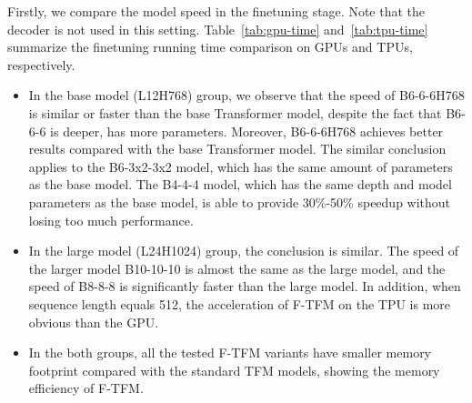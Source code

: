 \documentclass{article}
\theoremstyle{custom}
\begin{document}
Firstly, we compare the model speed in the finetuning stage. 
Note that the decoder is not used in this setting.
Table~\ref{tab:gpu-time} and~\ref{tab:tpu-time} summarize the finetuning running time comparison on GPUs and TPUs, respectively. 
\begin{itemize}[leftmargin=*,itemsep=0em]
\item In the base model (L12H768) group, we observe that the speed of B6-6-6H768 is similar or faster than the base Transformer model, despite the fact that B6-6-6 is deeper, has more parameters. 
Moreover, B6-6-6H768 achieves better results compared with the base Transformer model.
The similar conclusion applies to the B6-3x2-3x2 model, which has the same amount of parameters as the base model.
The B4-4-4 model, which has the same depth and model parameters as the base model, is able to provide 30\%-50\% speedup without losing too much performance. 
\item In the large model (L24H1024) group, the conclusion is similar. The speed of the larger model B10-10-10 is almost the same as the large model, and the speed of B8-8-8 is significantly faster than the large model. In addition, when sequence length equals 512, the acceleration of F-TFM on the TPU  is more obvious than the GPU.
\item In the both groups, all the tested F-TFM variants have smaller memory footprint compared with the standard TFM models, showing the memory efficiency of F-TFM. 
\end{itemize}
\end{document}
